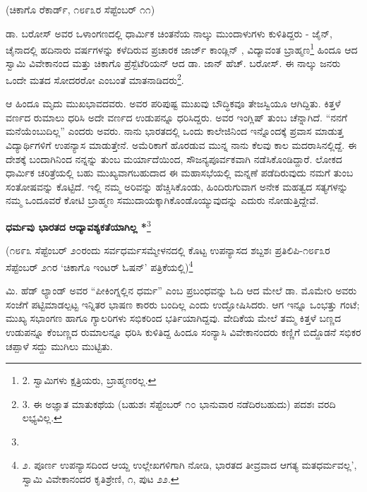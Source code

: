 \begin{center}
(ಚಿಕಾಗೊ ರೆಕಾರ್ಡ್, ೧೮೯೩ರ ಸೆಪ್ಟೆಂಬರ್ ೧೧)
\end{center}

ಡಾ. ಬರೋಸ್ \enginline{[Barrow's]} ಅವರ ಒಳಾಂಗಣದಲ್ಲಿ ಧಾರ್ಮಿಕ ಚಿಂತನೆಯ ನಾಲ್ಕು ಮುಂದಾಳುಗಳು ಕುಳಿತಿದ್ದರು - ಜೈನ್, ಚೈನಾದಲ್ಲಿ ಹದಿನಾರು ವರ್ಷಗಳನ್ನು ಕಳೆದಿರುವ ಪ್ರಚಾರಕ ಜಾರ್ಜ್ ಕಾಂಡ್ಲಿನ್ \enginline{[Candline]}, ವಿದ್ಯಾವಂತ ಬ್ರಾಹ್ಮಣ\footnote{2. ಸ್ವಾಮಿಗಳು ಕ್ಷತ್ರಿಯರು, ಬ್ರಾಹ್ಮಣರಲ್ಲ.} ಹಿಂದೂ ಆದ ಸ್ವಾಮಿ ವಿವೇಕಾನಂದ ಮತ್ತು ಚಿಕಾಗೊ ಪ್ರೆಸ್ಬೆಟೆರಿಯನ್ ಆದ ಡಾ. ಜಾನ್ ಹೆಚ್. ಬರೋಸ್. ಈ ನಾಲ್ಕು ಜನರು ಒಂದೇ ಮತದ ಸೋದರರೋ ಎಂಬಂತೆ ಮಾತನಾಡಿದರು\footnote{3. ಈ ಅಜ್ಞಾತ ಮಾತುಕಥೆಯ (ಬಹುಶಃ ಸೆಪ್ಟೆಂಬರ್ ೧೦ ಭಾನುವಾರ ನಡೆದಿರಬಹುದು) ಪದಶಃ ವರದಿ ಲಭ್ಯವಿಲ್ಲ.}.

ಆ ಹಿಂದೂ ಮೃದು ಮುಖಭಾವದವರು. ಅವರ ಪರಿಪುಷ್ಟ ಮುಖವು ಬೌದ್ಧಿಕವೂ ತೇಜಸ್ವಿಯೂ ಆಗಿದ್ದಿತು. ಕಿತ್ತಳೆ ವರ್ಣದ ರುಮಾಲು ಧರಿಸಿ ಅದೇ ವರ್ಣದ ಉಡುಪನ್ನೂ ಧರಿಸಿದ್ದರು. ಅವರ ಇಂಗ್ಲಿಷ್ ತುಂಬ ಚೆನ್ನಾಗಿದೆ. “ನನಗೆ ಮನೆಯೆಂಬುದಿಲ್ಲ” ಎಂದರು ಅವರು. ನಾನು ಭಾರತದಲ್ಲಿ ಒಂದು ಕಾಲೇಜಿನಿಂದ ಇನ್ನೊಂದಕ್ಕೆ ಪ್ರವಾಸ ಮಾಡುತ್ತ ವಿದ್ಯಾರ್ಥಿಗಳಿಗೆ ಉಪನ್ಯಾಸ ಮಾಡುತ್ತೇನೆ. ಅಮೆರಿಕಾಗೆ ಹೊರಡುವ ಮುನ್ನ ನಾನು ಕೆಲವು ಕಾಲ ಮದರಾಸಿನಲ್ಲಿದ್ದೆ. ಈ ದೇಶಕ್ಕೆ ಬಂದಾಗಿನಿಂದ ನನ್ನನ್ನು ತುಂಬ ಮರ್ಯಾದೆಯಿಂದ, ಸೌಜನ್ಯಪೂರ್ವಕವಾಗಿ ನಡೆಸಿಕೊಂಡಿದ್ದಾರೆ. ಲೋಕದ ಧಾರ್ಮಿಕ ಚರಿತ್ರೆಯಲ್ಲಿ ಬಹು ಮುಖ್ಯವಾಗಬಹುದಾದ ಈ ಮಹಾಸಭೆಯಲ್ಲಿ ಮನ್ನಣೆ ಪಡೆದಿರುವುದು ನಮಗೆ ತುಂಬ ಸಂತೋಷವನ್ನು ಕೊಟ್ಟಿದೆ. ಇಲ್ಲಿ ನಮ್ಮ ಅರಿವನ್ನು ಹೆಚ್ಚಿಸಿಕೊಂಡು, ಹಿಂದಿರುಗುವಾಗ ಅನೇಕ ಮಹತ್ವದ ಸತ್ಯಗಳನ್ನು ನಮ್ಮ ಒಂದೂವರೆ ಕೋಟಿ ಬ್ರಾಹ್ಮಣ ಸಮುದಾಯಕ್ಕಾಗಿಕೊಂಡೊಯ್ಯುವುದನ್ನು ಎದುರು ನೋಡುತ್ತಿದ್ದೇವೆ.

\begin{center}
\textbf{ಧರ್ಮವು ಭಾರತದ ಆದ್ಯಾವಶ್ಯಕತೆಯಾಗಿಲ್ಲ *}\footnote{}
\end{center}

\begin{center}
(೧೮೯೩ ಸೆಪ್ಟೆಂಬರ್ ೨೦ರಂದು ಸರ್ವಧರ್ಮಸಮ್ಮೇಳನದಲ್ಲಿ ಕೊಟ್ಟ ಉಪನ್ಯಾಸದ ಶಬ್ದಶಃ ಪ್ರತಿಲಿಪಿ-೧೮೯೩ರ ಸೆಪ್ಟೆಂಬರ್ ೨೧ರ ‘ಚಿಕಾಗೊ ಇಂಟರ್ ಓಷನ್’ ಪತ್ರಿಕೆಯಲ್ಲಿ)\footnote{೨. ಪೂರ್ಣ ಉಪನ್ಯಾಸದಿಂದ ಆಯ್ದ ಉಲ್ಲೇಖಗಳಿಗಾಗಿ ನೋಡಿ, ಭಾರತದ ತೀವ್ರವಾದ ಆಗತ್ಯ ಮತಧರ್ಮವಲ್ಲ’, ಸ್ವಾಮಿ ವಿವೇಕಾನಂದರ ಕೃತಿಶ್ರೇಣಿ, ೧, ಪುಟ ೨೨.}
\end{center}

\begin{center}
\end{center}

ಮಿ. ಹೆಡ್ ಲ್ಯಾಂಡ್ ಅವರ “ಪೀಕಿಂಗ್ನಲ್ಲಿನ ಧರ್ಮ” ಎಂಬ ಪ್ರಬಂಧವನ್ನು ಓದಿ ಆದ ಮೇಲೆ ಡಾ. ಮೊಮೇರಿ ಅವರು ಸಂಜೆಗೆ ಪಟ್ಟಿಮಾಡಲ್ಪಟ್ಟ ಇನ್ನಿತರ ಭಾಷಣ ಕಾರರು ಬಂದಿಲ್ಲ ಎಂದು ಉದ್ಘೋಷಿಸಿದರು. ಆಗ ಇನ್ನೂ ಒಂಭತ್ತು ಗಂಟೆ; ಮುಖ್ಯ ಸಭಾಂಗಣ ಹಾಗೂ ಗ್ಯಾಲರಿಗಳು ಸಭಿಕರಿಂದ ಭರ್ತಿಯಾಗಿದ್ದವು. ವೇದಿಕೆಯ ಮೇಲೆ ತಮ್ಮ ಕಿತ್ತಳೆ ಬಣ್ಣದ ಉಡುಪನ್ನೂ ಕೆಂಬಣ್ಣದ ರುಮಾಲನ್ನೂ ಧರಿಸಿ ಕುಳಿತಿದ್ದ ಹಿಂದೂ ಸಂನ್ಯಾಸಿ ವಿವೇಕಾನಂದರು ಕಣ್ಣಿಗೆ ಬಿದ್ದೊಡನೆ ಸಭಿಕರ ಚಪ್ಪಾಳೆ ಸದ್ದು ಮುಗಿಲು ಮುಟ್ಟಿತು.

